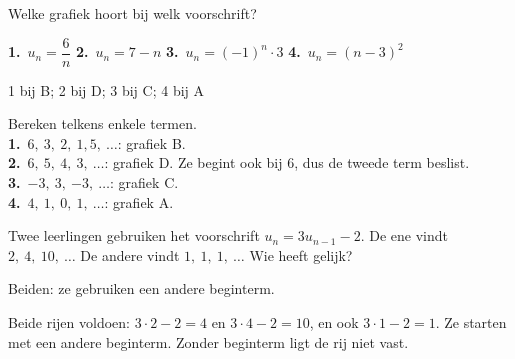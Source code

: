 \begin{oefeningen}
\begin{oefening}[1]\label{oef:h1-grafiek}
Welke grafiek hoort bij welk voorschrift?

\vspace{1mm}
\noindent\textbf{1.}~$u_n = \dfrac{6}{n}$ \qquad \textbf{2.}~$u_n = 7 - n$ \qquad \textbf{3.}~$u_n = (-1)^n \cdot 3$ \qquad \textbf{4.}~$u_n = (n-3)^2$

\vspace{1mm}
\noindent{}\hfill
{}\hfill
{}\hfill
{}
\begin{solution}
1 bij B; 2 bij D; 3 bij C; 4 bij A
\end{solution}
\begin{fullsolution}
Bereken telkens enkele termen.\\
\textbf{1.}~$6,\ 3,\ 2,\ 1{,}5,\ \ldots$: grafiek B.\\
\textbf{2.}~$6,\ 5,\ 4,\ 3,\ \ldots$: grafiek D. Ze begint ook bij 6, dus de tweede term beslist.\\
\textbf{3.}~$-3,\ 3,\ {-3},\ \ldots$: grafiek C.\\
\textbf{4.}~$4,\ 1,\ 0,\ 1,\ \ldots$: grafiek A.
\end{fullsolution}
\end{oefening}

\begin{oefening}[1]
Twee leerlingen gebruiken het voorschrift $u_n = 3u_{n-1} - 2$. De ene vindt $2,\ 4,\ 10,\ \ldots$ De andere vindt $1,\ 1,\ 1,\ \ldots$ Wie heeft gelijk?
\begin{solution}
Beiden: ze gebruiken een andere beginterm.
\end{solution}
\begin{fullsolution}
Beide rijen voldoen: $3\cdot 2-2=4$ en $3\cdot 4-2=10$, en ook $3\cdot 1-2=1$. Ze starten met een andere beginterm. Zonder beginterm ligt de rij niet vast.
\end{fullsolution}
\end{oefening}


\end{oefeningen}
